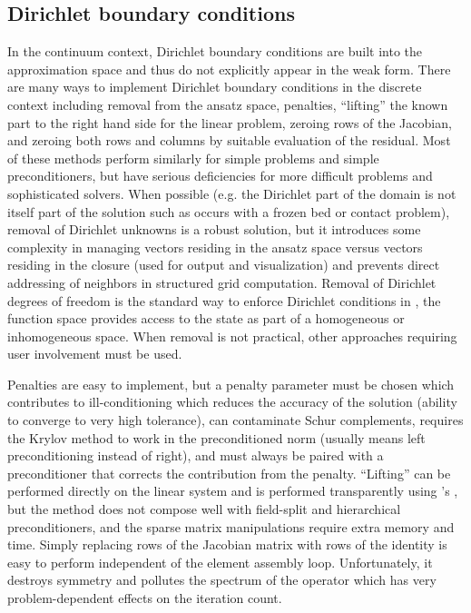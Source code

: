 \subsection{Dirichlet boundary conditions}\label{ssec:implementation-dirichlet}
In the continuum context, Dirichlet boundary conditions are built into the approximation space and thus do not explicitly appear in the weak form.
There are many ways to implement Dirichlet boundary conditions in the discrete context including removal from the ansatz space, penalties, ``lifting'' the known part to the right hand side for the linear problem, zeroing rows of the Jacobian, and zeroing both rows and columns by suitable evaluation of the residual.
Most of these methods perform similarly for simple problems and simple preconditioners, but have serious deficiencies for more difficult problems and sophisticated solvers.
When possible (e.g. the Dirichlet part of the domain is not itself part of the solution such as occurs with a frozen bed or contact problem), removal of Dirichlet unknowns is a robust solution, but it introduces some complexity in managing vectors residing in the ansatz space versus vectors residing in the closure (used for output and visualization) and prevents direct addressing of neighbors in structured grid computation.
Removal of Dirichlet degrees of freedom is the standard way to enforce Dirichlet conditions in \Dohp, the function space provides access to the state as part of a homogeneous or inhomogeneous space.
When removal is not practical, other approaches requiring user involvement must be used.

Penalties are easy to implement, but a penalty parameter must be chosen which contributes to ill-conditioning which reduces the accuracy of the solution (ability to converge to very high tolerance), can contaminate Schur complements, requires the Krylov method to work in the preconditioned norm (usually means left preconditioning instead of right), and must always be paired with a preconditioner that corrects the contribution from the penalty.
``Lifting'' can be performed directly on the linear system and is performed transparently using \PETSc's , but the method does not compose well with field-split and hierarchical preconditioners, and the sparse matrix manipulations require extra memory and time.
Simply replacing rows of the Jacobian matrix with rows of the identity is easy to perform independent of the element assembly loop.
Unfortunately, it destroys symmetry and pollutes the spectrum of the operator which has very problem-dependent effects on the iteration count.

